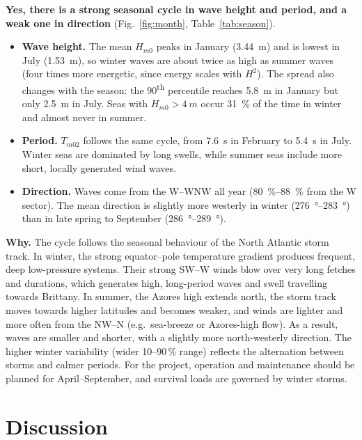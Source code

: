 \documentclass[11pt,a4paper]{article}
\newcommand{\Hs}{H_{m0}}
\newcommand{\Tm}{T_{m02}}
\begin{document}
\textbf{Yes, there is a strong seasonal cycle in wave height and period, and a weak one in direction} (Fig.~\ref{fig:month}, Table~\ref{tab:season}).
\begin{itemize}
  \item \textbf{Wave height.} The mean $\Hs$ peaks in January (\SI{3.44}{m}) and is lowest in July (\SI{1.53}{m}), so winter waves are about twice as high as summer waves (four times more energetic, since energy scales with $H^2$). The spread also changes with the season: the 90\textsuperscript{th} percentile reaches \SI{5.8}{m} in January but only \SI{2.5}{m} in July. Seas with $\Hs>\SI{4}{m}$ occur \SI{31}{\percent} of the time in winter and almost never in summer.
  \item \textbf{Period.} $\Tm$ follows the same cycle, from \SI{7.6}{s} in February to \SI{5.4}{s} in July. Winter seas are dominated by long swells, while summer seas include more short, locally generated wind waves.
  \item \textbf{Direction.} Waves come from the W--WNW all year (\SIrange{80}{88}{\percent} from the W sector). The mean direction is slightly more westerly in winter (\SIrange{276}{283}{\degree}) than in late spring to September (\SIrange{286}{289}{\degree}).
\end{itemize}
\textbf{Why.} The cycle follows the seasonal behaviour of the North Atlantic storm track.
In winter, the strong equator--pole temperature gradient produces frequent, deep low-pressure systems. Their strong SW--W winds blow over very long fetches and durations, which generates high, long-period waves and swell travelling towards Brittany.
In summer, the Azores high extends north, the storm track moves towards higher latitudes and becomes weaker, and winds are lighter and more often from the NW--N (e.g.\ sea-breeze or Azores-high flow). As a result, waves are smaller and shorter, with a slightly more north-westerly direction.
The higher winter variability (wider 10--90\,\% range) reflects the alternation between storms and calmer periods.
For the project, operation and maintenance should be planned for April--September, and survival loads are governed by winter storms.

\section{Discussion}
\end{document}
